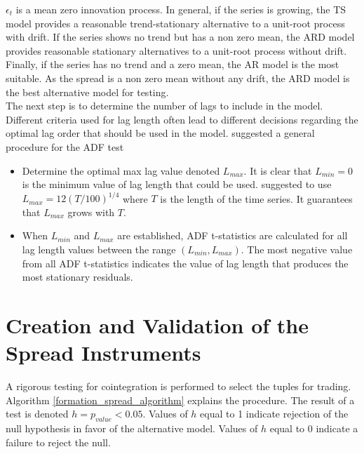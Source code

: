 \documentclass[11pt,a4,twosided,singlespacing,titlepagenumber=on]{scrreprt}
\numberwithin{equation}{chapter} %
\theoremstyle{remark}
\begin{document}
$\epsilon_t$ is a mean zero innovation process. In general, if the series is growing, the TS model provides a reasonable trend-stationary alternative to a unit-root process with drift. If the series shows no trend but has a non zero mean, the ARD model provides reasonable stationary alternatives to a unit-root process without drift. Finally, if the series has no trend and a zero mean, the AR model is the most suitable. As the spread is a non zero mean without any drift, the ARD model is the best alternative model for testing. \\

The next step is to determine the number of lags to include in the model. Different criteria used for lag length often lead to different decisions regarding the optimal lag order that should be used in the model. \cite{daoimpact} suggested a general procedure for the ADF test
\begin{itemize}
\item Determine the optimal max lag value denoted $L_{max}$. It is clear that $L_{min} = 0$ is the minimum value of lag length that could be used. \cite{schwert2002} suggested to use $L_{max} = 12 \left(T / 100 \right)^{1/4}$ where $T$ is the length of the time series. It guarantees that $L_{max}$ grows with $T$.
\item When $L_{min}$ and $L_{max}$ are established, ADF t-statistics are calculated for all lag length values between the range $(L_{min}, L_{max})$. The most negative value from all ADF t-statistics indicates the value of lag length that produces the most stationary residuals.
\end{itemize}

\section{Creation and Validation of the Spread Instruments}
A rigorous testing for cointegration is performed to select the tuples for trading. Algorithm \ref{formation_spread_algorithm} explains the procedure. The result of a test is denoted $h = p_{value} < 0.05$. Values of $h$ equal to 1 indicate rejection of the null hypothesis in favor of the alternative model. Values of $h$ equal to 0 indicate a failure to reject the null.
\end{document}
